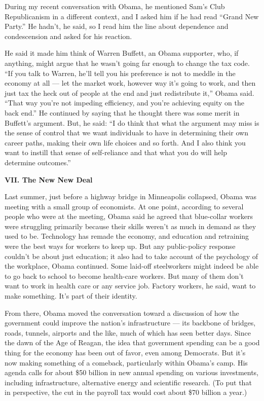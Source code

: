 During my recent conversation with Obama, he mentioned Sam's Club
Republicanism in a different context, and I asked him if he had read
``Grand New Party.'' He hadn't, he said, so I read him the line about
dependence and condescension and asked for his reaction.

He said it made him think of Warren Buffett, an Obama supporter, who, if
anything, might argue that he wasn't going far enough to change the tax
code. ``If you talk to Warren, he'll tell you his preference is not to
meddle in the economy at all --- let the market work, however way it's
going to work, and then just tax the heck out of people at the end and
just redistribute it,'' Obama said. ``That way you're not impeding
efficiency, and you're achieving equity on the back end.'' He continued
by saying that he thought there was some merit in Buffett's argument.
But, he said: ``I do think that what the argument may miss is the sense
of control that we want individuals to have in determining their own
career paths, making their own life choices and so forth. And I also
think you want to instill that sense of self-reliance and that what you
do will help determine outcomes.''

\textbf{VII. The New New Deal}

Last summer, just before a highway bridge in Minneapolis collapsed,
Obama was meeting with a small group of economists. At one point,
according to several people who were at the meeting, Obama said he
agreed that blue-collar workers were struggling primarily because their
skills weren't as much in demand as they used to be. Technology has
remade the economy, and education and retraining were the best ways for
workers to keep up. But any public-policy response couldn't be about
just education; it also had to take account of the psychology of the
workplace, Obama continued. Some laid-off steelworkers might indeed be
able to go back to school to become health-care workers. But many of
them don't want to work in health care or any service job. Factory
workers, he said, want to make something. It's part of their identity.

From there, Obama moved the conversation toward a discussion of how the
government could improve the nation's infrastructure --- its backbone of
bridges, roads, tunnels, airports and the like, much of which has seen
better days. Since the dawn of the Age of Reagan, the idea that
government spending can be a good thing for the economy has been out of
favor, even among Democrats. But it's now making something of a
comeback, particularly within Obama's camp. His agenda calls for about
\$50 billion in new annual spending on various investments, including
infrastructure, alternative energy and scientific research. (To put that
in perspective, the cut in the payroll tax would cost about \$70 billion
a year.)

